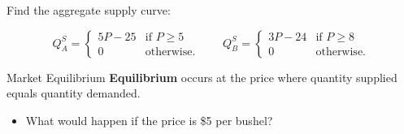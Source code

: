 \documentclass[12pt,t]{beamer}
\begin{document}
\begin{frame}

  \bigskip
  Find the aggregate supply curve:

  $$
    Q_A^S =
    \begin{cases}
      5P - 25 & \text{if } P \geq 5 \\
      0       & \text{otherwise}.
    \end{cases}
    \quad\quad
    Q_B^S =
    \begin{cases}
      3P - 24 & \text{if } P  \geq 8 \\
      0       & \text{otherwise}.
    \end{cases}
  $$
\end{frame}

\begin{frame}{Market Equilibrium}
  \textbf{Equilibrium} occurs at the price where quantity supplied equals quantity demanded. 

  \pause
  \begin{itemize}
    \item What would happen if the price is \$5 per bushel?
  \end{itemize}
\end{frame}
\end{document}
